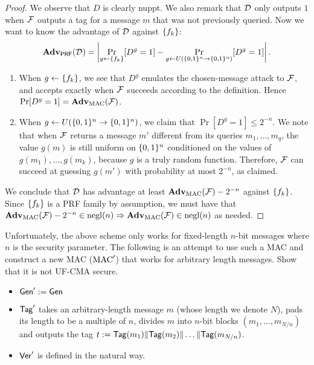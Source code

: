 \documentclass[11pt]{article}
\begin{document}
\begin{proof}
  We observe that $D$ is clearly nuppt.  We also remark that $\mathcal{D}$
  only outputs $1$ when $\mathcal{F}$ outputs a tag for a message $m$ that
  was not previously queried.  Now we want to know the advantage of
  $\mathcal{D}$ against $\{f_k\}$:
  \[
  \mathbf{Adv}_{\mathsf{PRF}}(\mathcal{D}) = \left|\Pr_{g \gets \{f_k\}}[D^g = 1] -
    \Pr_{g \gets U(\{0,1\}^n \to \{0,1\}^n)}[D^g = 1]\right|.
  \]
  \begin{enumerate}
  \item When $g \gets \{f_k\}$, we see that $D^g$ emulates the
    chosen-message attack to $\mathcal{F}$, and accepts exactly when $\mathcal{F}$
    succeeds according to the definition.  Hence $\Pr[D^g = 1] =
    \mathbf{Adv}_{\text{MAC}}(\mathcal{F})$.
  \item When $g \gets U(\{0,1\}^n \to \{0,1\}^n)$, we claim that $\Pr[D^g =
    1] \leq 2^{-n}$.  We note that when $\mathcal{F}$ returns a message $m'$
    different from its queries $m_1,\dots,m_q$, the value $g(m)$ is
    still uniform on $\{0,1\}^n$ conditioned on the values of
    $g(m_1),\dots,g(m_k)$, because $g$ is a truly random function.
    Therefore, $\mathcal{F}$ can succeed at guessing $g(m')$ with probability
    at most $2^{-n}$, as claimed.
  \end{enumerate}
  We conclude that $\mathcal{D}$ has advantage at least $\mathbf{Adv}_{\text{MAC}}(\mathcal{F})
  - 2^{-n}$ against $\{f_k\}$.  Since $\{f_k\}$ is a PRF family by
  assumption, we must have that $\mathbf{Adv}_{\text{MAC}}(\mathcal{F}) - 2^{-n} \in
  \operatorname{negl}(n) \Rightarrow \mathbf{Adv}_{\text{MAC}}(\mathcal{F}) \in \operatorname{negl}(n)$ as needed.
\end{proof}

\begin{question}
  Unfortunately, the above scheme only works for fixed-length
  \(n\)-bit messages where \(n\) is the security parameter. The
  following is an attempt to use such a MAC and construct a new MAC
  (\(\text{MAC}'\)) that works for arbitrary length messages. Show that it
  is not UF-CMA secure.
  \begin{itemize}
  \item \(\mathsf{Gen}' := \mathsf{Gen}\)
  \item \(\mathsf{Tag}'\) takes an arbitrary-length message \(m\) (whose
    length we denote \(N\)), pads its length to be a multiple of
    \(n\), divides \(m\) into \(n\)-bit blocks
    \((m_1, \ldots, m_{N/n})\) and outputs the tag
    \(t := \mathsf{Tag}(m_1) \| \mathsf{Tag}(m_2) \| \ldots \|
    \mathsf{Tag}(m_{N/n})\).
  \item \(\mathsf{Ver}'\) is defined in the natural way.
  \end{itemize}
  \leavevmode
\end{question}
\end{document}
